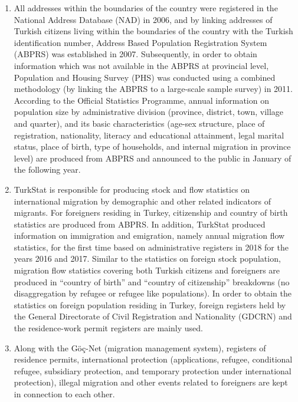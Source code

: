 \documentclass[
]{article}
\begin{document}
\begin{enumerate}
\def\labelenumi{\arabic{enumi}.}
\setcounter{enumi}{166}
\item
  All addresses within the boundaries of the country were registered
  in the National Address Database (NAD) in 2006, and by linking
  addresses of Turkish citizens living within the boundaries of the
  country with the Turkish identification number, Address Based
  Population Registration System (ABPRS) was established in 2007.
  Subsequently, in order to obtain information which was not available
  in the ABPRS at provincial level, Population and Housing Survey
  (PHS) was conducted using a combined methodology (by linking the
  ABPRS to a large-scale sample survey) in 2011. According to the
  Official Statistics Programme, annual information on population size
  by administrative division (province, district, town, village and
  quarter), and its basic characteristics (age-sex structure, place of
  registration, nationality, literacy and educational attainment,
  legal marital status, place of birth, type of households, and
  internal migration in province level) are produced from ABPRS and
  announced to the public in January of the following year.
\item
  TurkStat is responsible for producing stock and flow statistics on
  international migration by demographic and other related indicators
  of migrants. For foreigners residing in Turkey, citizenship and
  country of birth statistics are produced from ABPRS. In addition,
  TurkStat produced information on immigration and emigration, namely
  annual migration flow statistics, for the first time based on
  administrative registers in 2018 for the years 2016 and 2017.
  Similar to the statistics on foreign stock population, migration
  flow statistics covering both Turkish citizens and foreigners are
  produced in ``country of birth'' and ``country of citizenship''
  breakdowns (no disaggregation by refugee or refugee like
  populations). In order to obtain the statistics on foreign
  population residing in Turkey, foreign registers held by the General
  Directorate of Civil Registration and Nationality (GDCRN) and the
  residence-work permit registers are mainly used.
\item
  Along with the Göç-Net (migration management system), registers of
  residence permits, international protection (applications, refugee,
  conditional refugee, subsidiary protection, and temporary protection
  under international protection), illegal migration and other events
  related to foreigners are kept in connection to each other.

\end{enumerate}
\end{document}
